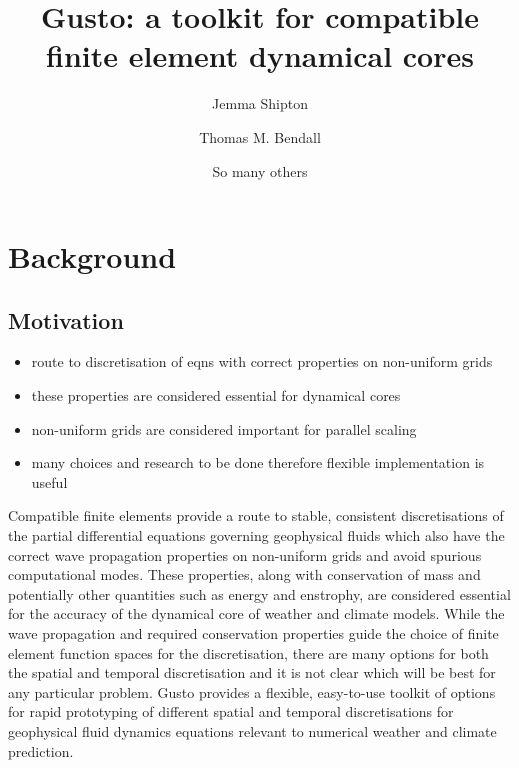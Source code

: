 \documentclass[11pt, a4paper]{article}
\begin{document}
\author[1,*]{Jemma Shipton}
\author[2]{Thomas M. Bendall}
\author[3]{So many others}


\title{Gusto: a toolkit for compatible finite element dynamical cores}
\date{}

\maketitle

\section{Background}



\subsection{Motivation}
\begin{itemize}
\item route to discretisation of eqns with correct properties on non-uniform grids
\item these properties are considered essential for dynamical cores
\item non-uniform grids are considered important for parallel scaling
\item many choices and research to be done therefore flexible implementation is useful
\end{itemize}

Compatible finite elements provide a route to stable, consistent
discretisations of the partial differential equations governing
geophysical fluids which also have the correct wave propagation
properties on non-uniform grids and avoid spurious computational
modes. These properties, along with conservation of mass and
potentially other quantities such as energy and enstrophy, are
considered essential for the accuracy of the dynamical core of weather
and climate models. While the wave propagation and required
conservation properties guide the choice of finite element function
spaces for the discretisation, there are many options for both the
spatial and temporal discretisation and it is not clear which will be
best for any particular problem. Gusto provides a flexible,
easy-to-use toolkit of options for rapid prototyping of different
spatial and temporal discretisations for geophysical fluid dynamics
equations relevant to numerical weather and climate prediction.
\end{document}
